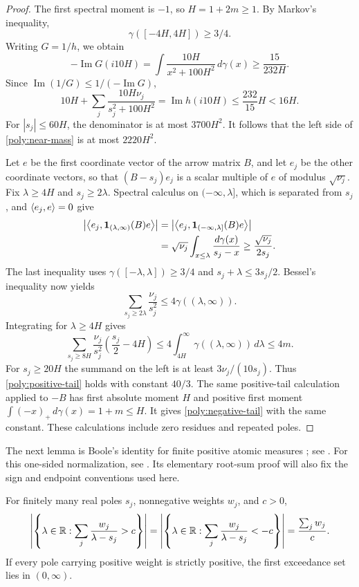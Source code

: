 \begin{proof}
The first spectral moment is $-1$, so $H=1+2m\geq1$.
By Markov's inequality,
\[
 \gamma([-4H,4H])\geq3/4.
\]
Writing $G=1/h$, we obtain
\[
 -\operatorname{Im}G(i10H)
 =\int\frac{10H}{x^2+100H^2}\,d\gamma(x)
 \geq\frac{15}{232H}.
\]
Since $\operatorname{Im}(1/G)\leq1/(-\operatorname{Im}G)$,
\[
 10H+\sum_j\frac{10H\nu_j}{s_j^2+100H^2}
 =\operatorname{Im}h(i10H)\leq\frac{232}{15}H<16H.
\]
For $|s_j|\leq60H$, the denominator is at most $3700H^2$.
It follows that the left side of \eqref{poly:near-mass} is at most
$2220H^2$.

Let $e$ be the first coordinate vector of the arrow matrix $B$, and let
$e_j$ be the other coordinate vectors, so that
$(B-s_j)e_j$ is a scalar multiple of $e$ of modulus $\sqrt{\nu_j}$.
Fix $\lambda\geq4H$ and $s_j\geq2\lambda$. Spectral calculus on
$(-\infty,\lambda]$, which is separated from $s_j$, and
$\left\langle e_j,e\right\rangle=0$ give
\begin{align*}
 \left|\left\langle e_j,\mathbf1_{(\lambda,\infty)}(B)e\right\rangle\right|
 &=\left|\left\langle e_j,\mathbf1_{(-\infty,\lambda]}(B)e\right\rangle\right|\\
 &=\sqrt{\nu_j}\int_{x\leq\lambda}\frac{d\gamma(x)}{s_j-x}
 \geq\frac{\sqrt{\nu_j}}{2s_j}.
\end{align*}
The last inequality uses
$\gamma([-\lambda,\lambda])\geq3/4$ and
$s_j+\lambda\leq3s_j/2$. Bessel's inequality now yields
\[
 \sum_{s_j\geq2\lambda}\frac{\nu_j}{s_j^2}
 \leq4\gamma((\lambda,\infty)).
\]
Integrating for $\lambda\geq4H$ gives
\[
 \sum_{s_j\geq8H}\frac{\nu_j}{s_j^2}
                    \left(\frac{s_j}{2}-4H\right)
 \leq4\int_{4H}^\infty\gamma((\lambda,\infty))\,d\lambda
 \leq4m.
\]
For $s_j\geq20H$ the summand on the left is at least
$3\nu_j/(10s_j)$. Thus \eqref{poly:positive-tail} holds with constant
$40/3$. The same positive-tail calculation applied to $-B$ has first
absolute moment $H$ and positive first moment
$\int(-x)_+\,d\gamma(x)=1+m\leq H$. It gives
\eqref{poly:negative-tail} with the same constant. These calculations
include zero residues and repeated poles.
\end{proof}

The next lemma is Boole's identity for finite positive atomic measures
\cite{Boole1857}; see \cite[Proposition~2.6 and Appendix~A]{AW15}.
For this one-sided normalization, see
\cite[Section~1, equations~(1.1), (1.3), and~(1.5)]{PSZ09}.
Its elementary root-sum proof will also fix the sign and endpoint
conventions used here.

\begin{lemma}\label{poly:boole}
For finitely many real poles $s_j$, nonnegative weights $w_j$, and $c>0$,
\begin{equation}\label{poly:boole-identities}
 \left|\left\{\lambda\in\mathbb R:
       \sum_j\frac{w_j}{\lambda-s_j}>c\right\}\right|
 =\left|\left\{\lambda\in\mathbb R:
       \sum_j\frac{w_j}{\lambda-s_j}<-c\right\}\right|
 =\frac{\sum_jw_j}{c}.
\end{equation}
If every pole carrying positive weight is strictly positive, the first
exceedance set lies in $(0,\infty)$.
\end{lemma}

